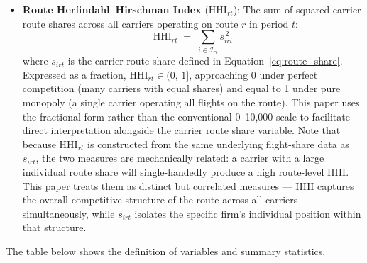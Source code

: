 \documentclass[preprint,12pt,authoryear]{elsarticle}
\begin{document}
\begin{itemize}
    \item \textbf{Route Herfindahl--Hirschman Index}
    ($\text{HHI}_{rt}$): The sum of squared carrier route shares
    across all carriers operating on route $r$ in period $t$:
    \begin{equation} \label{eq:hhi}
        \text{HHI}_{rt}
        \;=\;
        \sum_{i \in \mathcal{I}_{rt}} s_{irt}^{\,2}
    \end{equation}
    where $s_{irt}$ is the carrier route share defined in
    Equation~\eqref{eq:route_share}. Expressed as a fraction,
    $\text{HHI}_{rt} \in (0,\,1]$, approaching 0 under perfect
    competition (many carriers with equal shares) and equal to 1
    under pure monopoly (a single carrier operating all flights
    on the route). This paper uses the fractional form
    rather than the conventional 0--10{,}000 scale to
    facilitate direct interpretation alongside the carrier route
    share variable. Note that because $\text{HHI}_{rt}$ is
    constructed from the same underlying flight-share data as
    $s_{irt}$, the two measures are mechanically related:
    a carrier with a large individual route share will
    single-handedly produce a high route-level HHI. This paper
    treats them as distinct but correlated measures — HHI
    captures the overall competitive structure of the route
    across all carriers simultaneously, while $s_{irt}$ isolates
    the specific firm's individual position within that
    structure.

\end{itemize}


The table below shows the definition of variables and summary statistics.
\end{document}
